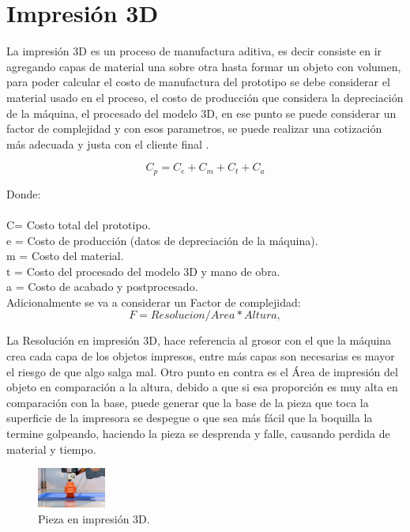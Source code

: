 \documentclass[conference]{IEEEtran}
\begin{document}
\section{Impresión 3D}

La impresión 3D es un proceso de manufactura aditiva, es decir consiste en ir agregando capas de material una sobre otra hasta formar un objeto con volumen, para poder calcular el costo de manufactura del prototipo se debe considerar el material usado en el proceso, el costo de producción que considera la depreciación de la máquina, el procesado del modelo 3D, en ese punto se puede considerar un factor de complejidad y con esos parametros, se puede realizar una cotización más adecuada y justa con el cliente final \cite{jimenez2013fabricacion}.

\begin{equation}
\label{ohm}
C_p = C_e + C_m + C_t + C_a
\end{equation}

Donde:\\
~\\
C= Costo total del prototipo.\\
e = Costo de producción (datos de depreciación de la máquina).\\
m = Costo del material.\\
t = Costo del procesado del modelo 3D y mano de obra.\\
a = Costo de acabado y postprocesado.\\


Adicionalmente se va a considerar un Factor de complejidad:  
 \begin{equation}
    \label{Homotopia_G}
     F= Resolucion / Area * Altura,
 \end{equation}
 
          
     
La Resolución en impresión 3D, hace referencia al grosor con el que la máquina crea cada capa de los objetos impresos, entre más capas son necesarias es mayor el riesgo de que algo salga mal. Otro punto en contra es el Área de impresión del objeto en comparación a la altura, debido a que si esa proporción es muy alta en comparación con la base, puede generar que la base de la pieza que toca la superficie de la impresora se despegue o que sea más fácil que la boquilla la termine golpeando, haciendo la pieza se desprenda y falle, causando perdida de material y tiempo. 

\begin{figure}[H]
\begin{center}
\includegraphics[width=0.2\textwidth]{imagenes/imp3d.eps} 
\caption{ Pieza en impresión 3D.}
\label{fig:hiper2}
\end{center}
\end{figure}   
 
\end{document}
